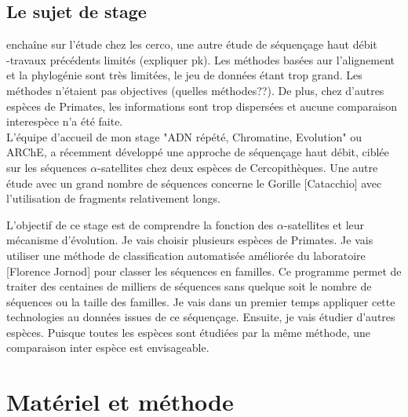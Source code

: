 \documentclass[12pt,a4paper]{article}
\begin{document}
\subsection{Le sujet de stage}
enchaîne sur l'étude chez les cerco, une autre étude de séquençage haut débit\\

-travaux précédents limités (expliquer pk). Les méthodes basées aur l'alignement et la phylogénie sont très limitées, le jeu de données étant trop grand. Les méthodes n'étaient pas objectives (quelles méthodes??). De plus, chez d'autres espèces de Primates, les informations sont trop dispersées et aucune comparaison interespèce n'a été faite. \\


L'équipe d'accueil de mon stage "ADN répété, Chromatine, Evolution" ou ARChE, a récemment développé une approche de séquençage haut débit, ciblée sur les séquences $\alpha$-satellites chez deux espèces de Cercopithèques. Une autre étude avec un grand nombre de séquences concerne le Gorille [Catacchio] avec l'utilisation de fragments relativement longs. 

L'objectif de ce stage est de comprendre la fonction des $\alpha$-satellites et leur mécanisme d'évolution. Je vais choisir plusieurs espèces de Primates. Je vais utiliser une méthode de classification automatisée améliorée du laboratoire [Florence Jornod] pour classer les séquences en familles.  Ce programme permet de traiter des centaines de milliers de séquences sans quelque soit le nombre de séquences ou la taille des familles. Je vais dans un premier temps appliquer cette technologies au données issues de ce séquençage. Ensuite, je vais étudier d'autres espèces. Puisque toutes les espèces sont étudiées par la  même méthode, une comparaison inter espèce est envisageable. 

\section{Matériel et méthode}
\end{document}
